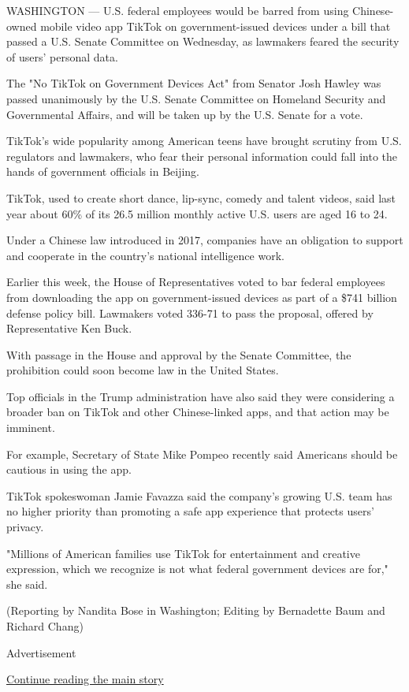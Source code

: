 WASHINGTON --- U.S. federal employees would be barred from using
Chinese-owned mobile video app TikTok on government-issued devices under
a bill that passed a U.S. Senate Committee on Wednesday, as lawmakers
feared the security of users' personal data.

The "No TikTok on Government Devices Act" from Senator Josh Hawley was
passed unanimously by the U.S. Senate Committee on Homeland Security and
Governmental Affairs, and will be taken up by the U.S. Senate for a
vote.

TikTok's wide popularity among American teens have brought scrutiny from
U.S. regulators and lawmakers, who fear their personal information could
fall into the hands of government officials in Beijing.

TikTok, used to create short dance, lip-sync, comedy and talent videos,
said last year about 60\% of its 26.5 million monthly active U.S. users
are aged 16 to 24.

Under a Chinese law introduced in 2017, companies have an obligation to
support and cooperate in the country's national intelligence work.

Earlier this week, the House of Representatives voted to bar federal
employees from downloading the app on government-issued devices as part
of a \$741 billion defense policy bill. Lawmakers voted 336-71 to pass
the proposal, offered by Representative Ken Buck.

With passage in the House and approval by the Senate Committee, the
prohibition could soon become law in the United States.

Top officials in the Trump administration have also said they were
considering a broader ban on TikTok and other Chinese-linked apps, and
that action may be imminent.

For example, Secretary of State Mike Pompeo recently said Americans
should be cautious in using the app.

TikTok spokeswoman Jamie Favazza said the company's growing U.S. team
has no higher priority than promoting a safe app experience that
protects users' privacy.

"Millions of American families use TikTok for entertainment and creative
expression, which we recognize is not what federal government devices
are for," she said.

(Reporting by Nandita Bose in Washington; Editing by Bernadette Baum and
Richard Chang)

Advertisement

\protect\hyperlink{after-bottom}{Continue reading the main story}

